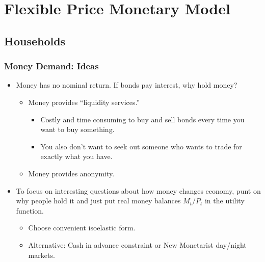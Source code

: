 \documentclass[english,xcolor=svgnames]{beamer}
\begin{document}




\section{Flexible Price Monetary Model}

\subsection{Households}

\begin{frame}
\frametitle{Money Demand: Ideas}
\begin{itemize}
	\item Money has no nominal return. If bonds pay interest, why hold money?
	\begin{itemize}
		\item Money provides ``liquidity services.''
		\begin{itemize}
			\item Costly and time consuming to buy and sell bonds every time you want to buy something.
			\item You also don't want to seek out someone who wants to trade for exactly what you have.
		\end{itemize}
		\item Money provides anonymity. 
	\end{itemize}
	\item To focus on interesting questions about how money changes economy, punt on why people hold it and just put real money balances $M_t/P_t$ in the utility function.
	\begin{itemize}
		\item Choose convenient isoelastic form.
		\item Alternative: Cash in advance constraint or New Monetarist day/night markets.
	\end{itemize}
\end{itemize}
\end{frame}
\end{document}
